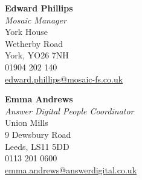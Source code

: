 \documentclass[a4paper]{cv}
\begin{document}
\begin{minipage}[t]{0.8\textwidth}
\begin{minipage}[t]{0.4\textwidth}
\textbf{Edward Phillips} \\
\textit{Mosaic Manager} \\
York House \\
Wetherby Road \\
York, YO26 7NH \\
01904 202 140 \\
\href{mailto:edward.phillips@mosaic-fs.co.uk}{edward.phillips@mosaic-fs.co.uk}
\end{minipage}
\begin{minipage}[t]{0.4\textwidth}
\textbf{Emma Andrews} \\
\textit{Answer Digital People Coordinator} \\
Union Mills \\
9 Dewsbury Road \\
Leeds, LS11 5DD \\
0113 201 0600 \\
\href{mailto:emma.andrews@answerdigital.co.uk}{emma.andrews@answerdigital.co.uk}
\end{minipage}

\sectionspace %

\vfill

{}

\end{minipage}
\end{document}
